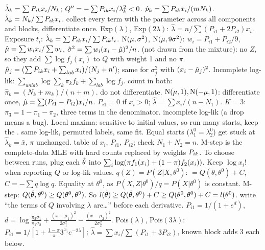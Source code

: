 \li{} $\hat\lambda_k=\sum P_{ik} x_i/N_k$; $Q''=-\sum P_{ik} x_i/\lambda_k^2<0$.  $\hat p_k=\sum P_{ik} x_i/(mN_k)$.  $\hat\lambda_k=N_k/\sum P_{ik} x_i$.
\sk{} collect every term with the parameter across all components and blocks, differentiate once. Exp$(\lambda)$, Exp$(2\lambda)$: $\hat\lambda=n/\sum(P_{i1}+2P_{i2})x_i$. Exposure $t_i$: $\hat\lambda_k=\sum P_{ik} x_i/\sum P_{ik} t_i$. $\mathrm{N}(\mu,\sigma^2)$, $\mathrm{N}(\mu,9\sigma^2)$: $w_i=P_{i1}+P_{i2}/9$, $\hat{\mu}=\sum w_ix_i/\sum w_i$, $\hat\sigma^2=\sum w_i(x_i-\hat{\mu})^2/n$.
\sk{} (not drawn from the mixture): no $Z$, so they add $\sum\log f_j(x_i)$ to $Q$ with weight 1 and no $\pi$.  $\hat{\mu}_j=(\sum P_{ik} x_i+\sum_{lab}x_i)/(N_j+n')$; same for $\sigma_j^2$ with $(x_i-\hat{\mu}_j)^2$. Incomplete log-lik: $\sum_{unlab}\log\sum_k\pi_kf_k+\sum_{lab}\log f_j$.
\sk{} count in both: $\hat\pi_k=(N_k+m_k)/(n+m)$.  do not differentiate.  $\mathrm{N}(\mu,1),\mathrm{N}(-\mu,1)$: differentiate once, $\hat{\mu}=\sum(P_{i1}-P_{i2})x_i/n$.  $P_{i1}=0$ if $x_i>0$; $\hat\lambda=\sum x_i/(n-N_1)$. $K=3$: $\pi_3=1-\pi_1-\pi_2$, three terms in the denominator.
\sk{} incomplete log-lik  (a drop means a bug). Local maxima: sensitive to initial values, so run many starts, keep the .  same log-lik, permuted labels, same fit. Equal starts ($\lambda_1^0=\lambda_2^0$) get stuck at $\hat\lambda_k=\bar x$, $\pi$ unchanged.
\sk{} table of $x_i$, $P_{i1}$, $P_{i2}$; check $N_1+N_2=n$. M-step is the complete-data MLE with hard counts replaced by weights $P_{ik}$. To choose between runs, plug each $\hat{\theta}$ into $\sum_{i}\log(\pi f_1(x_i)+(1-\pi)f_2(x_i))$. Keep $\log x_i!$ when reporting $Q$ or log-lik values.
\sk{} $q(Z)=P(Z|X,\theta^0)$:
$=Q(\theta,\theta^0)+C$, $C=-\sum q\log q$. Equality at $\theta^0$, as $P(X,Z|\theta^0)/q=P(X|\theta^0)$ is constant. M-step: $Q(\hat{\theta},\theta^0)\ge Q(\theta^0,\theta^0)$. So $l(\hat{\theta})\ge Q(\hat{\theta},\theta^0)+C\ge Q(\theta^0,\theta^0)+C=l(\theta^0)$.
\bx
{} write “the terms of $Q$ involving $\lambda$ are…” before each derivative.
\sk{} $P_{i1}=1/(1+e^{d})$, $d=\log\frac{\pi_2\sigma_1}{\pi_1\sigma_2}+\frac{(x-\mu_1)^2}{2\sigma_1^2}-\frac{(x-\mu_2)^2}{2\sigma_2^2}$.
\li Pois$(\lambda)$, Pois$(3\lambda)$: $P_{i1}=1/[1+\frac{1-\pi}\pi3^{x_i}e^{-2\lambda}]$; $\hat\lambda=\sum x_i/\sum(P_{i1}+3P_{i2})$, known block adds 3 each below.
